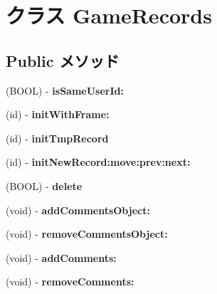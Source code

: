 \hypertarget{interface_game_records}{
\section{クラス GameRecords}
\label{interface_game_records}
}
\subsection*{Public メソッド}
\begin{DoxyCompactItemize}
\item 
\hypertarget{interface_game_records_a2dab8b4b0b68c5cbb28cf4374cc82c8e}{
(BOOL) -\/ {\bfseries isSameUserId:}}
\label{interface_game_records_a2dab8b4b0b68c5cbb28cf4374cc82c8e}

\item 
\hypertarget{interface_game_records_a4c007751279d28c5ef9a555185af647b}{
(id) -\/ {\bfseries initWithFrame:}}
\label{interface_game_records_a4c007751279d28c5ef9a555185af647b}

\item 
\hypertarget{interface_game_records_ac3933518fde18be29721aadd915dd419}{
(id) -\/ {\bfseries initTmpRecord}}
\label{interface_game_records_ac3933518fde18be29721aadd915dd419}

\item 
\hypertarget{interface_game_records_a9175f5a52d0e12f805adacda7d3b14de}{
(id) -\/ {\bfseries initNewRecord:move:prev:next:}}
\label{interface_game_records_a9175f5a52d0e12f805adacda7d3b14de}

\item 
\hypertarget{interface_game_records_a827169d0d5899335d7f6239c9c9c4643}{
(BOOL) -\/ {\bfseries delete}}
\label{interface_game_records_a827169d0d5899335d7f6239c9c9c4643}

\item 
\hypertarget{interface_game_records_a8f9590c7a25b418a975081c8975d45be}{
(void) -\/ {\bfseries addCommentsObject:}}
\label{interface_game_records_a8f9590c7a25b418a975081c8975d45be}

\item 
\hypertarget{interface_game_records_ade7d4e93ddf1c6bcebd60690cfc5b77a}{
(void) -\/ {\bfseries removeCommentsObject:}}
\label{interface_game_records_ade7d4e93ddf1c6bcebd60690cfc5b77a}

\item 
\hypertarget{interface_game_records_a7fd8675a4d513ec0e665a045178c86d7}{
(void) -\/ {\bfseries addComments:}}
\label{interface_game_records_a7fd8675a4d513ec0e665a045178c86d7}

\item 
\hypertarget{interface_game_records_aa9ff8413bf66729084a91f9ee7847f2e}{
(void) -\/ {\bfseries removeComments:}}
\label{interface_game_records_aa9ff8413bf66729084a91f9ee7847f2e}

\end{DoxyCompactItemize}
